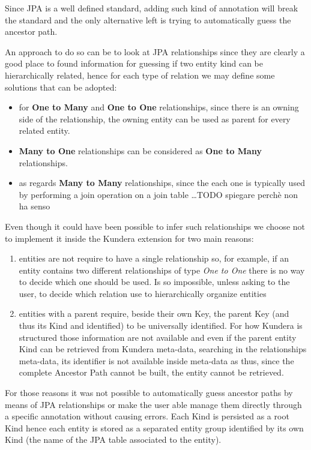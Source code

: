 \noindent Since JPA is a well defined standard, adding such kind of annotation will break the standard and the only alternative left is trying to automatically guess the ancestor path.

\noindent An approach to do so can be to look at JPA relationships since they are clearly a good place to found information for guessing if two entity kind can be hierarchically related, hence for each type of relation we may define some solutions that can be adopted:
\begin{itemize}
\item for \textbf{One to Many} and \textbf{One to One} relationships, since there is an owning side of the relationship, the owning entity can be used as parent for every related entity. 
\item \textbf{Many to One} relationships can be considered as \textbf{One to Many} relationships. 
\item as regards \textbf{Many to Many} relationships, since the each one is typically used by performing a join operation on a join table \dots TODO spiegare perchè non ha senso
\end{itemize}

\noindent Even though it could have been possible to infer such relationships we choose not to implement it inside the Kundera extension for two main reasons: 
\begin{enumerate}
\item entities are not require to have a single relationship so, for example, if an entity contains two different relationships of type \textit{One to One} there is no way to decide which one should be used. Is so impossible, unless asking to the user, to decide which relation use to hierarchically organize entities
\item entities with a parent require, beside their own Key, the parent Key (and thus its Kind and identified) to be universally identified. For how Kundera is structured those information are not available and even if the parent entity Kind can be retrieved from Kundera meta-data, searching in the relationships meta-data, its identifier is not available inside meta-data as thus, since the complete Ancestor Path cannot be built, the entity cannot be retrieved. 
\end{enumerate}
\noindent For those reasons it was not possible to automatically guess ancestor paths by means of JPA relationships or make the user able manage them directly through a specific annotation without causing errors.
Each Kind is persisted as a root Kind hence each entity is stored as a separated entity group identified by its own Kind (the name of the JPA table associated to the entity).

